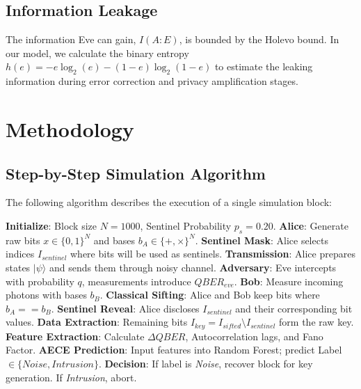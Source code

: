 \documentclass[journal,onecolumn,12pt,draftclsnofoot]{IEEEtran}
\begin{document}
\subsection{Information Leakage}
The information Eve can gain, $I(A:E)$, is bounded by the Holevo bound. In our model, we calculate the binary entropy $h(e) = -e\log_2(e) - (1-e)\log_2(1-e)$ to estimate the leaking information during error correction and privacy amplification stages.

\newpage

\section{Methodology}

\subsection{Step-by-Step Simulation Algorithm}
The following algorithm describes the execution of a single simulation block:

\begin{algorithm}
\caption{AECE-Enhanced BB84 Simulation}
\begin{algorithmic}[1]
\STATE \textbf{Initialize}: Block size $N=1000$, Sentinel Probability $p_s = 0.20$.
\STATE \textbf{Alice}: Generate raw bits $x \in \{0, 1\}^N$ and bases $b_A \in \{+, \times\}^N$.
\STATE \textbf{Sentinel Mask}: Alice selects indices $I_{sentinel}$ where bits will be used as sentinels.
\STATE \textbf{Transmission}: Alice prepares states $|\psi\rangle$ and sends them through noisy channel.
\STATE \textbf{Adversary}: Eve intercepts with probability $q$, measurements introduce $QBER_{eve}$.
\STATE \textbf{Bob}: Measure incoming photons with bases $b_B$.
\STATE \textbf{Classical Sifting}: Alice and Bob keep bits where $b_A == b_B$.
\STATE \textbf{Sentinel Reveal}: Alice discloses $I_{sentinel}$ and their corresponding bit values.
\STATE \textbf{Data Extraction}: Remaining bits $I_{key} = I_{sifted} \setminus I_{sentinel}$ form the raw key.
\STATE \textbf{Feature Extraction}: Calculate $\Delta QBER$, Autocorrelation lags, and Fano Factor.
\STATE \textbf{AECE Prediction}: Input features into Random Forest; predict Label $\in \{Noise, Intrusion\}$.
\STATE \textbf{Decision}: If label is \textit{Noise}, recover block for key generation. If \textit{Intrusion}, abort.
\end{algorithmic}
\end{algorithm}
\end{document}
